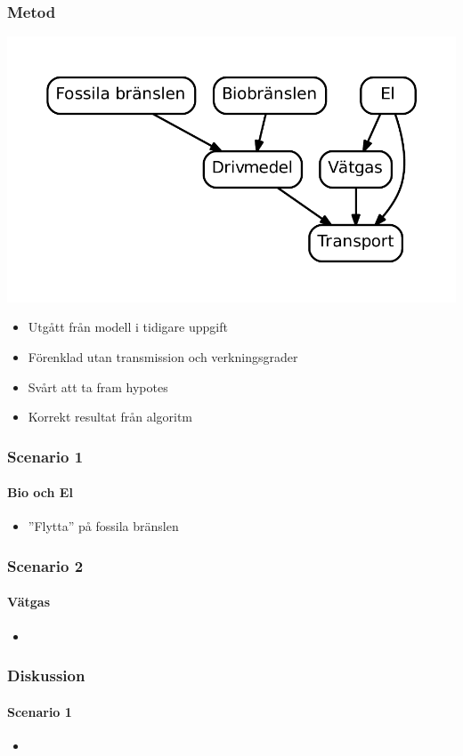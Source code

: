\documentclass{beamer}
\begin{document}
\begin{frame}
	\frametitle{Metod}
	\includegraphics[scale=0.5]{../report2/diagram.pdf}
	\begin{itemize}
		\item Utgått från modell i tidigare uppgift
		\item Förenklad utan transmission och verkningsgrader
		\item Svårt att ta fram hypotes
		\item Korrekt resultat från algoritm
	\end{itemize}
\end{frame}

\begin{frame}
	\frametitle{Scenario 1}
	\framesubtitle{Bio och El}
	\begin{itemize}
		\item ''Flytta'' på fossila bränslen
	\end{itemize}
\end{frame}

\begin{frame}
	\frametitle{Scenario 2}
	\framesubtitle{Vätgas}
	\begin{itemize}
		\item 
	\end{itemize}
\end{frame}

\begin{frame}
	\frametitle{Diskussion}
	\framesubtitle{Scenario 1}
	\begin{itemize}
		\item 
	\end{itemize}
\end{frame}
\end{document}
